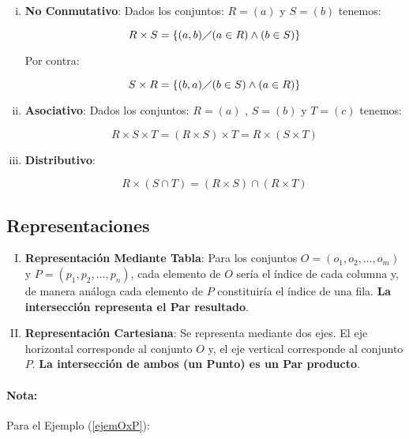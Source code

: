 \begin{enumerate}[i.]

\item \textbf{No Conmutativo}: Dados los conjuntos: $R = (a)$ y $S = (b)$ 
tenemos:

\begin{equation}
R \times S = \{(a,b) \diagup (a \in R) \wedge (b \in S)\} 
\end{equation}

Por contra:

\begin{equation}
S \times R = \{(b,a) \diagup (b \in S) \wedge (a \in R)\} 
\end{equation}

\item \textbf{Asociativo}: Dados los conjuntos: $R = (a)$ , $S = (b)$ y $T = 
(c)$ tenemos:

\begin{equation}
R \times S \times T = (R \times S) \times T = R \times (S \times T) 
\end{equation}


\item \textbf{Distributivo}:

\begin{equation}
R \times (S \cap T) = (R \times S) \cap (R \times T) 
\end{equation}

\end{enumerate}

\subsection{Representaciones}\label{sec:procCart}
{
\begin{enumerate}[I.]

\item \textbf{Representación Mediante Tabla}: Para los conjuntos $O = (o_1, 
o_2, 
\ldots , o_m)$ y $P = (p_1, p_2, \ldots , p_n)$, cada elemento de $O$ sería el 
índice de cada columna y, de manera análoga cada elemento de $P$ constituiría 
el 
índice de una fila. \textbf{La intersección representa el Par resultado}.

\item \textbf{Representación Cartesiana}: Se representa mediante dos ejes. El 
eje horizontal corresponde al conjunto $O$ y, el eje vertical corresponde al 
conjunto $P$. \textbf{La intersección de ambos (un Punto) es un Par producto}.



\end{enumerate}

\paragraph*{Nota:} Para el Ejemplo (\ref{ejemOxP}):



}%

